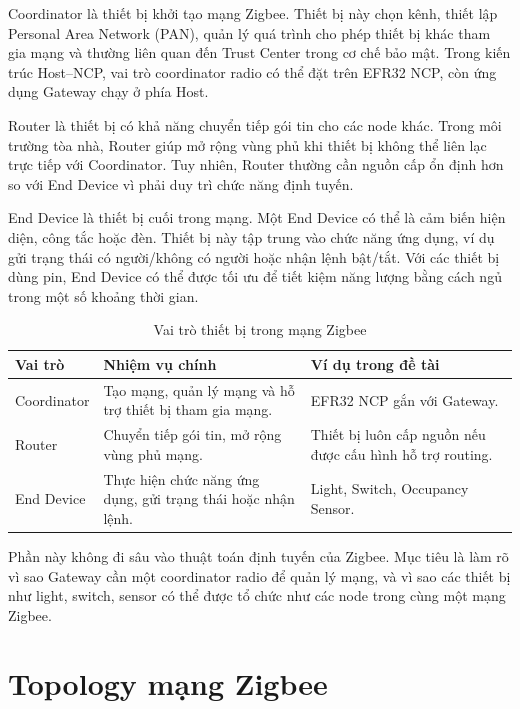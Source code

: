 Coordinator là thiết bị khởi tạo mạng Zigbee. Thiết bị này chọn kênh, thiết lập Personal Area Network (PAN), quản lý quá trình cho phép thiết bị khác tham gia mạng và thường liên quan đến Trust Center trong cơ chế bảo mật. Trong kiến trúc Host--NCP, vai trò coordinator radio có thể đặt trên EFR32 NCP, còn ứng dụng Gateway chạy ở phía Host.

Router là thiết bị có khả năng chuyển tiếp gói tin cho các node khác. Trong môi trường tòa nhà, Router giúp mở rộng vùng phủ khi thiết bị không thể liên lạc trực tiếp với Coordinator. Tuy nhiên, Router thường cần nguồn cấp ổn định hơn so với End Device vì phải duy trì chức năng định tuyến.

End Device là thiết bị cuối trong mạng. Một End Device có thể là cảm biến hiện diện, công tắc hoặc đèn. Thiết bị này tập trung vào chức năng ứng dụng, ví dụ gửi trạng thái có người/không có người hoặc nhận lệnh bật/tắt. Với các thiết bị dùng pin, End Device có thể được tối ưu để tiết kiệm năng lượng bằng cách ngủ trong một số khoảng thời gian.

\begin{table}[H]
\centering
\caption{Vai trò thiết bị trong mạng Zigbee}
\label{tab:ch2-zigbee-roles}
\begin{tabular}{|>{\raggedright\arraybackslash}p{3.5cm}|>{\raggedright\arraybackslash}p{5cm}|>{\raggedright\arraybackslash}p{4.5cm}|}
\hline
\textbf{Vai trò} & \textbf{Nhiệm vụ chính} & \textbf{Ví dụ trong đề tài} \\ \hline
Coordinator & Tạo mạng, quản lý mạng và hỗ trợ thiết bị tham gia mạng. & EFR32 NCP gắn với Gateway. \\ \hline
Router & Chuyển tiếp gói tin, mở rộng vùng phủ mạng. & Thiết bị luôn cấp nguồn nếu được cấu hình hỗ trợ routing. \\ \hline
End Device & Thực hiện chức năng ứng dụng, gửi trạng thái hoặc nhận lệnh. & Light, Switch, Occupancy Sensor. \\ \hline
\end{tabular}
\end{table}

Phần này không đi sâu vào thuật toán định tuyến của Zigbee. Mục tiêu là làm rõ vì sao Gateway cần một coordinator radio để quản lý mạng, và vì sao các thiết bị như light, switch, sensor có thể được tổ chức như các node trong cùng một mạng Zigbee.

\section{Topology mạng Zigbee}
\label{sec:ch2-zigbee-topology}

